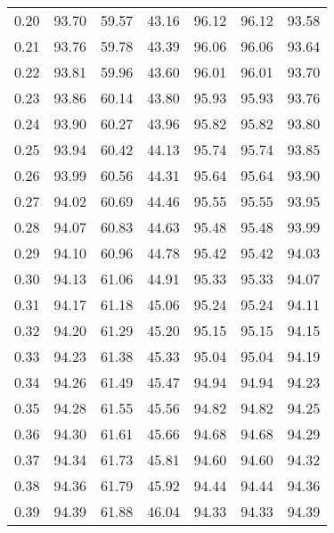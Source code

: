 \begin{tabular}{|c|c|c|c|c|c|c|}
      0.20 &     93.70 &     59.57 &      43.16 &   96.12 &      96.12 &         93.58 \\
      0.21 &     93.76 &     59.78 &      43.39 &   96.06 &      96.06 &         93.64 \\
      0.22 &     93.81 &     59.96 &      43.60 &   96.01 &      96.01 &         93.70 \\
      0.23 &     93.86 &     60.14 &      43.80 &   95.93 &      95.93 &         93.76 \\
      0.24 &     93.90 &     60.27 &      43.96 &   95.82 &      95.82 &         93.80 \\
      0.25 &     93.94 &     60.42 &      44.13 &   95.74 &      95.74 &         93.85 \\
      0.26 &     93.99 &     60.56 &      44.31 &   95.64 &      95.64 &         93.90 \\
      0.27 &     94.02 &     60.69 &      44.46 &   95.55 &      95.55 &         93.95 \\
      0.28 &     94.07 &     60.83 &      44.63 &   95.48 &      95.48 &         93.99 \\
      0.29 &     94.10 &     60.96 &      44.78 &   95.42 &      95.42 &         94.03 \\
      0.30 &     94.13 &     61.06 &      44.91 &   95.33 &      95.33 &         94.07 \\
      0.31 &     94.17 &     61.18 &      45.06 &   95.24 &      95.24 &         94.11 \\
      0.32 &     94.20 &     61.29 &      45.20 &   95.15 &      95.15 &         94.15 \\
      0.33 &     94.23 &     61.38 &      45.33 &   95.04 &      95.04 &         94.19 \\
      0.34 &     94.26 &     61.49 &      45.47 &   94.94 &      94.94 &         94.23 \\
      0.35 &     94.28 &     61.55 &      45.56 &   94.82 &      94.82 &         94.25 \\
      0.36 &     94.30 &     61.61 &      45.66 &   94.68 &      94.68 &         94.29 \\
      0.37 &     94.34 &     61.73 &      45.81 &   94.60 &      94.60 &         94.32 \\
      0.38 &     94.36 &     61.79 &      45.92 &   94.44 &      94.44 &         94.36 \\
      0.39 &     94.39 &     61.88 &      46.04 &   94.33 &      94.33 &         94.39 \\

\end{tabular}
